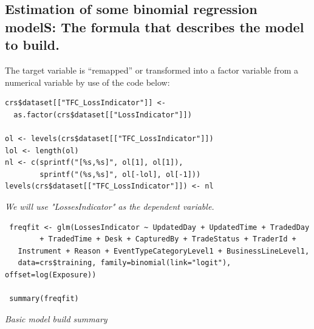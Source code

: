 \documentclass{DissertateUSU}
\begin{document}
\subsection{Estimation of some binomial regression modelS: The formula that describes the model to build.}

The target variable is ``remapped'' or transformed into a factor
variable from a numerical variable by use of the code below:

\small

\begin{verbatim}
crs$dataset[["TFC_LossIndicator"]] <- 
  as.factor(crs$dataset[["LossIndicator"]])

ol <- levels(crs$dataset[["TFC_LossIndicator"]])
lol <- length(ol)
nl <- c(sprintf("[%s,%s]", ol[1], ol[1]), 
        sprintf("(%s,%s]", ol[-lol], ol[-1]))
levels(crs$dataset[["TFC_LossIndicator"]]) <- nl
\end{verbatim}

\emph{We will use "LossesIndicator" as the dependent variable.}

\small

\begin{verbatim}
 freqfit <- glm(LossesIndicator ~ UpdatedDay + UpdatedTime + TradedDay
        + TradedTime + Desk + CapturedBy + TradeStatus + TraderId +
   Instrument + Reason + EventTypeCategoryLevel1 + BusinessLineLevel1,
   data=crs$training, family=binomial(link="logit"), offset=log(Exposure))

 summary(freqfit)
\end{verbatim}

\normalsize

\emph{Basic model build summary}
\end{document}
